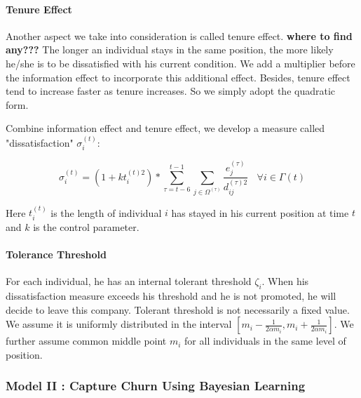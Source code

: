 \documentclass[tcn = 37075, sheet = true, abstract = true]{mcmthesis}
\begin{document}
\paragraph{Tenure Effect}

Another aspect we take into consideration is called tenure effect. \textbf{where to find any???} The longer an individual stays in the same position, the more likely he/she is to be dissatisfied with his current condition. We add a multiplier before the information effect to incorporate this additional effect. Besides, tenure effect tend to increase faster as tenure increases. So we simply adopt the quadratic form.

Combine information effect and tenure effect, we develop a measure called "dissatisfaction" $\sigma_i^{(t)}$:

$$\displaystyle \sigma_i^{(t)}=(1+kt_i^{(t)2})*\sum_{\tau=t-6}^{t-1}\sum_{j\in \Omega^{(\tau)}}\frac{e_j^{(\tau)}}{d_{ij}^{(\tau)2}}~~~~\forall i\in \Gamma{(t)}$$

Here $t_i^{(t)}$ is the length of individual $i$ has stayed in his current position at time $t$ and $k$ is the control parameter. 

\paragraph{Tolerance Threshold}

For each individual, he has an internal tolerant threshold $\zeta_i$. When his dissatisfaction measure exceeds his threshold and he is not promoted, he will decide to leave this company. Tolerant threshold is not necessarily a fixed value. We assume it is uniformly distributed in the interval $\displaystyle [m_i-\frac{1}{2\alpha m_i},m_i+\frac{1}{2\alpha m_i}]$. We further assume common middle point $m_i$ for all individuals in the same level of position.


\subsubsection{Model II : Capture Churn Using Bayesian Learning}

\end{document}
